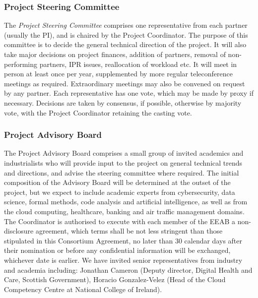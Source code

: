 \documentclass[a4paper,11pt]{article}
\begin{document}
\subsubsection*{Project Steering Committee}
\vspace{-5pt}

The \emph{Project Steering Committee} comprises one representative from each partner
(usually the PI), and is chaired by the Project Coordinator.  
The purpose of this committee is to decide
the general technical direction of the project.  It will also
take major decisions on project finances, addition of partners, removal of non-performing
partners, IPR issues, reallocation of workload etc.  It will meet in person
at least once per year, supplemented by more regular teleconference
meetings as required. Extraordinary meetings may also be convened on request by any partner.
Each representative has one vote, which
may be made by proxy if necessary.  Decisions are taken by
consensus, if possible, otherwise by majority vote, with the
Project Coordinator retaining the casting vote.

\subsubsection*{Project Advisory Board}
\vspace{-5pt}

The Project Advisory Board comprises a small group of invited
academics and industrialists who will provide input to the
project on general technical trends and directions, and advise
the steering committee where required.  The initial composition
of the Advisory Board will be determined at the outset of the
project, but we expect to include academic experts from cybersecurity, data science, formal methods, code analysis and artificial intelligence, as well as from the cloud computing, healthcare, banking and air traffic management domains. The Coordinator is authorised to 
execute with each member of the EEAB a non-disclosure agreement, which 
terms shall be not less stringent than those stipulated in this 
Consortium Agreement, no later than 30 calendar days after their nomination 
or before any confidential information will be exchanged, whichever date is earlier. 
We have invited senior representatives from industry and academia including: Jonathan Cameron (Deputy director, Digital Health and Care, Scottish Government), Horacio Gonzalez-Velez (Head of the Cloud Competency Centre at National College of Ireland). 
\end{document}
